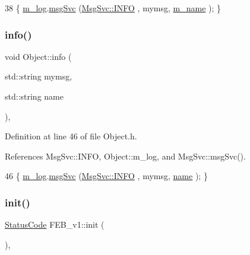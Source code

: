 \begin{DoxyCode}
38 \{ \hyperlink{classObject_a0d269813dd7ac1f24bc143031e2963f2}{m\_log}.\hyperlink{classMsgSvc_ad25f18047920cc59a314e5098259711c}{msgSvc} (\hyperlink{classMsgSvc_ae671eb7301996cd049d2da8a65925926ad2fcf3f3e734fc41ee097cc23670ce51}{MsgSvc::INFO}    , mymsg, \hyperlink{classObject_a8b83c95c705d2c3ba0d081fe1710f48d}{m\_name} ); \}
\end{DoxyCode}
\mbox{\label{classObject_a1ca123253dfd30fc28b156f521dcbdae}} 
\subsubsection{\texorpdfstring{info()}{info()}\hspace{0.1cm}{\footnotesize\ttfamily [2/2]}}
{\footnotesize\ttfamily void Object\+::info (\begin{DoxyParamCaption}\item[{std\+::string}]{mymsg,  }\item[{std\+::string}]{name }\end{DoxyParamCaption})\hspace{0.3cm}{\ttfamily [inline]}, {\ttfamily [inherited]}}



Definition at line 46 of file Object.\+h.



References Msg\+Svc\+::\+I\+N\+FO, Object\+::m\+\_\+log, and Msg\+Svc\+::msg\+Svc().


\begin{DoxyCode}
46 \{ \hyperlink{classObject_a0d269813dd7ac1f24bc143031e2963f2}{m\_log}.\hyperlink{classMsgSvc_ad25f18047920cc59a314e5098259711c}{msgSvc} (\hyperlink{classMsgSvc_ae671eb7301996cd049d2da8a65925926ad2fcf3f3e734fc41ee097cc23670ce51}{MsgSvc::INFO}    , mymsg, \hyperlink{classObject_a300f4c05dd468c7bb8b3c968868443c1}{name} ); \}
\end{DoxyCode}
\mbox{\label{classFEB__v1_a70d7d266c7d05fdfab21d5b0293f1ad8}} 
\subsubsection{\texorpdfstring{init()}{init()}}
{\footnotesize\ttfamily \hyperlink{classStatusCode}{Status\+Code} F\+E\+B\+\_\+v1\+::init (\begin{DoxyParamCaption}{ }\end{DoxyParamCaption})\hspace{0.3cm}{\ttfamily [inline]}, {\ttfamily [virtual]}}

